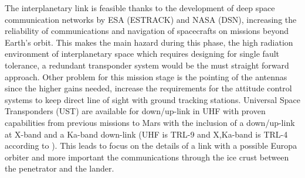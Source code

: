 The interplanetary link is feasible thanks to the development of deep space communication networks by ESA (ESTRACK) and NASA (DSN), increasing the reliability of communications and navigation of spacecrafts on missions beyond Earth's orbit. This makes the main hazard during this phase, the high radiation environment of interplanetary space which requires designing for single fault tolerance, a redundant transponder system would be the must straight forward approach. Other problem for this mission stage is the pointing of the antennas since the higher gains needed, increase the requirements for the attitude control systems to keep direct line of sight with ground tracking stations. Universal Space Transponders (UST) are available for down/up-link in UHF with proven capabilities from previous missions to Mars with the inclusion of a down/up-link at X-band and a Ka-band down-link (UHF is TRL-9 and X,Ka-band is TRL-4 according to \cite{clipper}). This leads to focus on the details of a link with a possible Europa orbiter and more important the communications through the ice crust between the penetrator and the lander.


